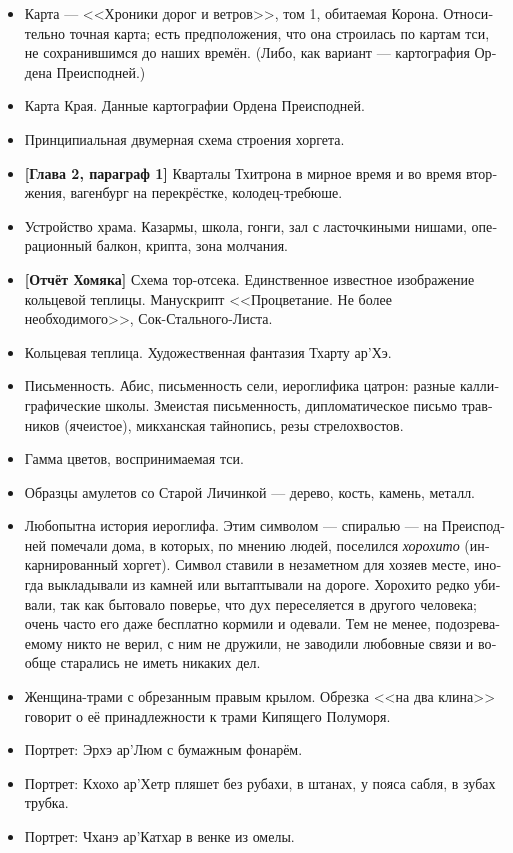 \documentclass[a4paper,12pt,fleqn]{book}\usepackage{cooltooltips}\usepackage{polyglossia}\setdefaultlanguage[babelshorthands=true]{russian}\setotherlanguage{english}\defaultfontfeatures{Ligatures=TeX,Mapping=tex-text} \usepackage{xcolor}\definecolor{lightgray}{HTML}{bbbbbb}\color{lightgray}\newcommand{\ml}[3]{\textenglish{\textcolor{black}{#3}}}
\begin{document}
{\begin{itemize}
\item Карта --- <<Хроники дорог и ветров>>, том 1, обитаемая Корона.
Относительно точная карта;
есть предположения, что она строилась по картам тси, не сохранившимся до наших времён.
(Либо, как вариант --- картография Ордена Преисподней.)
\item Карта Края.
Данные картографии Ордена Преисподней.
\item Принципиальная двумерная схема строения хоргета.
\item \textbf{[Глава 2, параграф 1]}
Кварталы Тхитрона в мирное время и во время вторжения, вагенбург на перекрёстке, колодец-требюше.
\item Устройство храма.
Казармы, школа, гонги, зал с ласточкиными нишами, операционный балкон, крипта, зона молчания.
\item \textbf{[Отчёт Хомяка]}
Схема тор-отсека.
Единственное известное изображение кольцевой теплицы.
Манускрипт <<Процветание. Не более необходимого>>, Сок-Стального-Листа.
\item Кольцевая теплица.
Художественная фантазия Тхарту ар'Хэ.
\item Письменность.
Абис, письменность сели, иероглифика цатрон: разные каллиграфические школы.
Змеистая письменность, дипломатическое письмо травников (ячеистое), микханская тайнопись, резы стрелохвостов.
\item Гамма цветов, воспринимаемая тси.
\item Образцы амулетов со Старой Личинкой --- дерево, кость, камень, металл.
\item Любопытна история иероглифа.
Этим символом --- спиралью --- на Преисподней помечали дома, в которых, по мнению людей, поселился \emph{хорохито} (инкарнированный хоргет).
Символ ставили в незаметном для хозяев месте, иногда выкладывали из камней или вытаптывали на дороге.
Хорохито редко убивали, так как бытовало поверье, что дух переселяется в другого человека;
очень часто его даже бесплатно кормили и одевали.
Тем не менее, подозреваемому никто не верил, с ним не дружили, не заводили любовные связи и вообще старались не иметь никаких дел.
\item Женщина-трами с обрезанным правым крылом.
Обрезка <<на два клина>> говорит о её принадлежности к трами Кипящего Полуморя.
\item Портрет: Эрхэ ар'Люм с бумажным фонарём.
\item Портрет: Кхохо ар'Хетр пляшет без рубахи, в штанах, у пояса сабля, в зубах трубка.
\item Портрет: Чханэ ар'Катхар в венке из омелы.

\end{itemize}}
\end{document}
